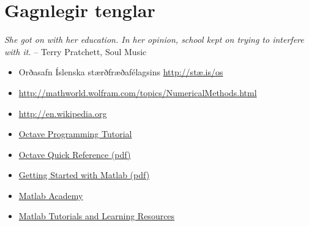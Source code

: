 \documentclass[letterpaper,10pt,icelandic]{sphinxmanual}
\begin{document}
\section{Gagnlegir tenglar}
\label{vidauki:gagnlegir-tenglar}
\emph{She got on with her education. In her opinion, school kept on trying to interfere with it.}
-- Terry Pratchett, Soul Music
\begin{itemize}
\item {} 
Orðasafn Íslenska stærðfræðafélagsins \href{http://stae.is/os}{http://stæ.is/os}

\item {} 
\href{http://mathworld.wolfram.com/topics/NumericalMethods.html}{http://mathworld.wolfram.com/topics/NumericalMethods.html}

\item {} 
\href{http://en.wikipedia.org}{http://en.wikipedia.org}

\item {} 
\href{https://en.wikibooks.org/wiki/Octave\_Programming\_Tutorial}{Octave Programming Tutorial}

\item {} 
\href{http://www.lehman.edu/academics/cmacs/documents/refcard-a4.pdf}{Octave Quick Reference (pdf)}

\item {} 
\href{http://se.mathworks.com/help/pdf\_doc/matlab/getstart.pdf?s\_tid=int\_tut}{Getting Started with Matlab (pdf)}

\item {} 
\href{https://matlabacademy.mathworks.com/R2015b/}{Matlab Academy}

\item {} 
\href{http://se.mathworks.com/academia/student\_center/tutorials/launchpad.html}{Matlab Tutorials and Learning Resources}

\end{itemize}



\renewcommand{\indexname}{Atriðaskrá}
\printindex
\end{document}
